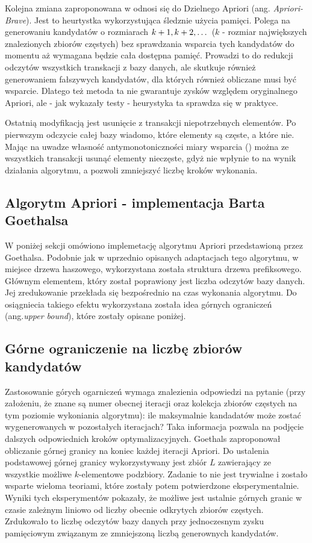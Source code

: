 Kolejna zmiana zaproponowana w \cite{Bodon} odnosi się do Dzielnego Apriori (ang. \textit{Apriori-Brave}). Jest to heurtystka wykorzystująca śledznie użycia pamięci. Polega na generowaniu kandydatów o rozmiarach \(k\nolinebreak+\nolinebreak 1, k\nolinebreak+\nolinebreak 2, \dots\) (\(k\) - rozmiar największych znalezionych zbiorów częstych) bez sprawdzania wsparcia tych kandydatów do momentu aż wymagana będzie cała dostępna pamięć. Prowadzi to do redukcji odczytów wszystkich transkacji z bazy danych, ale skutkuje również generowaniem fałszywych kandydatów, dla których również obliczane musi być wsparcie. Dlatego też metoda ta nie gwarantuje zysków względem oryginalnego Apriori, ale - jak wykazały testy - heurystyka ta sprawdza się w praktyce.

Ostatnią modyfikacją jest usunięcie z transakcji niepotrzebnych elementów. Po pierwszym odczycie całej bazy wiadomo, które elementy są częste, a które nie. Mając na uwadze własność antymonotoniczności miary wsparcia (\cite{Morzy}) można ze wszystkich transakcji usunąć elementy nieczęste, gdyż nie wpłynie to na wynik działania algorytmu, a pozwoli zmniejszyć liczbę kroków wykonania. 

\subsection{Algorytm Apriori - implementacja Barta Goethalsa \cite{Goethals}}
\label{c324}
W poniżej sekcji omówiono implemetację algorytmu Apriori przedstawioną przez Goethalsa. Podobnie jak w uprzednio opisanych adaptacjach tego algorytmu,  w miejsce drzewa haszowego, wykorzystana została struktura drzewa prefiksowego. Głównym elementem, który został poprawiony jest liczba odczytów bazy danych. Jej zredukowanie przekłada się bezpośrednio na czas wykonania algorytmu. Do osiągniecia takiego efektu wykorzystana została idea górnych ograniczeń (ang.\textit{upper bound}), które zostały opisane poniżej.

\subsection*{Górne ograniczenie na liczbę zbiorów kandydatów}
Zastosowanie górych ogarniczeń wymaga znalezienia odpowiedzi na pytanie (przy założeniu, że znane są numer obecnej iteracji oraz kolekcja zbiorów częstych na tym poziomie wykoniania algorytmu): ile maksymalnie kandadatów może zostać wygenerowanych w pozostałych iteracjach? Taka informacja pozwala na podjęcie dalszych odpowiednich kroków optymalizacyjnych. Goethals \cite{Goethals} zaproponował obliczanie górnej granicy na koniec każdej iteracji Apriori. Do ustalenia podstawowej górnej granicy wykorzystywany jest zbiór \(L\) zawierający ze wszystkie możliwe \(k\)-elementowe podzbiory. Zadanie to nie jest trywialne i zostało wsparte wieloma teoriami, które zostały potem potwierdzone eksperymentalnie. Wyniki tych eksperymentów pokazały, że możliwe jest ustalnie górnych granic w czasie zależnym liniowo od liczby obecnie odkrytych zbiorów częstych. Zrdukowało to liczbę odczytów bazy danych przy jednoczesnym zysku pamięciowym związanym ze zmniejszoną liczbą generownych kandydatów. 


